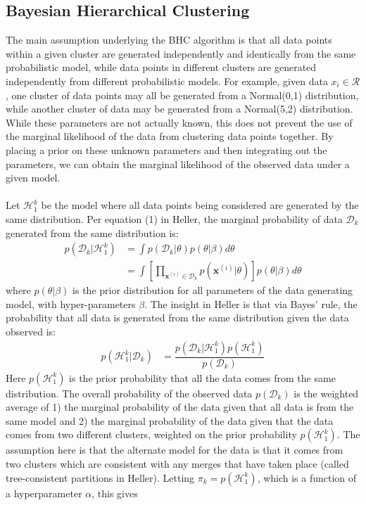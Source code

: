 \documentclass{article}
\begin{document}
\subsection{Bayesian Hierarchical Clustering}
The main assumption underlying the BHC algorithm is that all data points within a given cluster are generated independently and identically from the same probabilistic model, while data points in different clusters are generated independently from different probabilistic models.  For example, given data $x_i \in \mathcal{R}$, one cluster of data points may all be generated from a Normal(0,1) distribution, while another cluster of data may be generated from a Normal(5,2) distribution.  While these parameters are not actually known, this does not prevent the use of the marginal likelihood of the data from clustering data points together.  By placing a prior on these unknown parameters and then integrating out the parameters, we can obtain the marginal likelihood of the observed data under a given model.  
\\
\\
Let $\mathcal{H}_1^k$ be the model where all data points being considered are generated by the same distribution.  Per equation (1) in Heller, the marginal probability of data $\mathcal{D}_k$ generated from the same distribution is:
\begin{align}
    p(\mathcal{D}_k | \mathcal{H}_1^k) &= \int p(\mathcal{D}_k|\theta)p(\theta|\beta)d\theta \nonumber \\
        &= \int \left[ \prod_{\mathbf{x}^{(i)} \in \mathcal{D}_k} p(\mathbf{x}^{(i)}|\theta)\right] p(\theta|\beta)d\theta
\end{align}
where $p(\theta | \beta)$ is the prior distribution for all parameters of the data generating model, with hyper-parameters $\beta$.  The insight in Heller is that via Bayes' rule, the probability that all data is generated from the same distribution given the data observed is:
\begin{align*}
    p(\mathcal{H}_1^k | \mathcal{D}_k) &= \dfrac{p(\mathcal{D}_k | \mathcal{H}_1^k)p(\mathcal{H}_1^k)}{p(\mathcal{D}_k)}
\end{align*}
Here $p(\mathcal{H}_1^k)$ is the prior probability that all the data comes from the same distribution.  The overall probability of the observed data $p(\mathcal{D}_k)$ is the weighted average of 1) the marginal probability of the data given that all data is from the same model and 2) the marginal probability of the data given that the data comes from two different clusters, weighted on the prior probability $p(\mathcal{H}_1^k)$.  The assumption here is that the alternate model for the data is that it comes from two clusters which are consistent with any merges that have taken place (called tree-consistent partitions in Heller).  Letting $\pi_k = p(\mathcal{H}_1^k)$, which is a function of a hyperparameter $\alpha$, this gives
\end{document}
